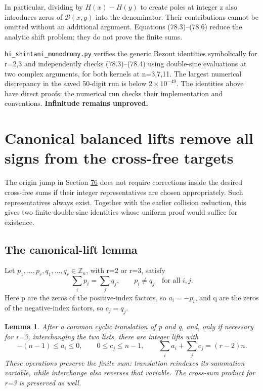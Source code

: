 \documentclass[11pt,reqno]{amsart}
\theoremstyle{plain}
\newtheorem{lemma}[theorem]{Lemma}
\begin{document}
In particular, dividing by \(H(x)-H(y)\) to create poles at
integer z also introduces zeros of \(\mathcal B(x,y)\) into
the denominator. Their contributions cannot be omitted without
an additional argument. Equations (78.3)--(78.6) reduce the
analytic shift problem; they do not prove the finite sums.

\texttt{hi\_\allowbreak shintani\_\allowbreak monodromy.py} verifies the generic Bezout identities
symbolically for r=2,3 and independently checks (78.3)--(78.4)
using double-sine evaluations at two complex arguments, for both
kernels at n=3,7,11. The largest numerical discrepancy in the
saved 50-digit run is below \(2\times10^{-49}\). The identities
above have direct proofs; the numerical run checks their
implementation and conventions. \textbf{Infinitude remains unproved.}

\section{Canonical balanced lifts remove all signs from the cross-free targets}\label{sec:79}

The origin jump in Section \hyperref[sec:76]{76} does not require corrections inside
the desired cross-free sums if their integer representatives are
chosen appropriately. Such representatives always exist. Together
with the earlier collision reduction, this gives two finite
double-sine identities whose uniform proof would suffice for
existence.

\subsection{The canonical-lift lemma}\label{sec:79.1}

Let \(p_1,\ldots,p_r,q_1,\ldots,q_r\in\mathbb Z_n\), with
r=2 or r=3, satisfy
\[
 \sum_i p_i=\sum_j q_j,\qquad p_i\ne q_j\quad\text{for all }i,j.
\]
Here p are the zeros of the positive-index factors, so
\(a_i=-p_i\), and q are the zeros of the negative-index factors,
so \(c_j=q_j\).

\begin{lemma}
After a common cyclic translation of p and q, and,
only if necessary for r=3, interchanging the two lists, there
are integer lifts with
\begin{equation*}
 \boxed{\displaystyle
 -(n-1)\le a_i\le0,\qquad 0\le c_j\le n-1,
 \qquad \sum_i a_i+\sum_jc_j=(r-2)n.}
 \tag{79.1}
\end{equation*}
These operations preserve the finite sum: translation reindexes
its summation variable, while interchange also reverses that
variable. The cross-sum product for r=3 is preserved as well.
\end{lemma}
\end{document}
